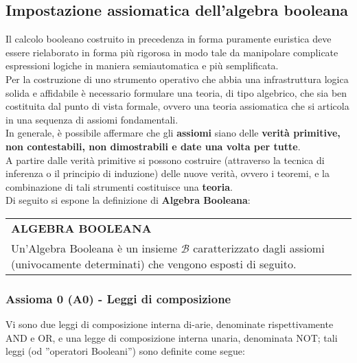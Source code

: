 \documentclass[a4paper]{extarticle}
\newcommand{\quotes}[1]{''#1''}
\renewcommand\arraystretch{}
\begin{document}
\subsection{Impostazione assiomatica dell'algebra booleana}
Il calcolo booleano costruito in precedenza in forma puramente euristica deve essere rielaborato in forma più rigorosa in modo tale da manipolare complicate espressioni logiche in maniera semiautomatica e più semplificata.\\
Per la costruzione di uno strumento operativo che abbia una infrastruttura logica solida e affidabile è necessario formulare una teoria, di tipo algebrico, che sia ben costituita dal punto di vista formale, ovvero una teoria assiomatica che si articola in una sequenza di assiomi fondamentali.\\
In generale, è possibile affermare che gli \textbf{assiomi} siano delle \textbf{verità primitive, non contestabili, non dimostrabili e date una volta per tutte}.\\
A partire dalle verità primitive si possono costruire (attraverso la tecnica di inferenza o il principio di induzione) delle nuove verità, ovvero i teoremi, e la combinazione di tali strumenti costituisce una \textbf{teoria}.\\
Di seguito si espone la definizione di \textbf{Algebra Booleana}:

\vspace{1em}
\setlength{\tabcolsep}{14pt}
\renewcommand{\arraystretch}{2}
\noindent
\begin{tabularx}{\textwidth}{@{}|P|@{}}
    \hline
    {\textbf{ALGEBRA BOOLEANA}}\\
    \parbox{\linewidth}{Un'Algebra Booleana è un insieme \(\mathcal{B}\) caratterizzato dagli assiomi (univocamente determinati) che vengono esposti di seguito.
    \vspace{3mm}}\\
    \hline
\end{tabularx}

\subsubsection{Assioma 0 (A0) - Leggi di composizione}
Vi sono due leggi di composizione interna di-arie, denominate rispettivamente AND e OR, e una legge di composizione interna unaria, denominata NOT; tali leggi (od \quotes{operatori Booleani}) sono definite come segue:
\end{document}

